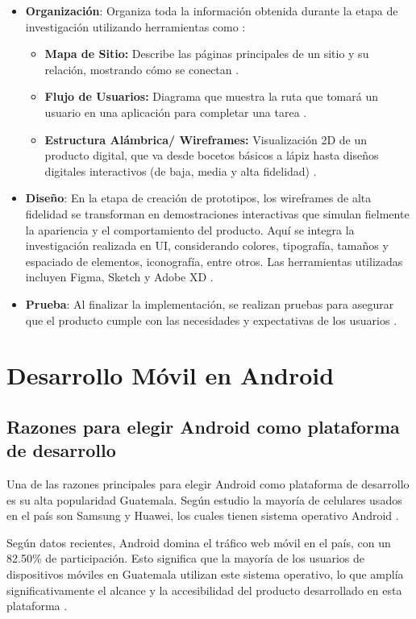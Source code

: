 \begin{itemize}
    
    \item \textbf{Organización}: Organiza toda la información obtenida durante la etapa de investigación utilizando herramientas como \cite{Leon2013}:
    \begin{itemize}
        \item \textbf{Mapa de Sitio:} Describe las páginas principales de un sitio y su relación, mostrando cómo se conectan  \cite{Semi2022}.
        \item \textbf{Flujo de Usuarios:} Diagrama que muestra la ruta que tomará un usuario en una aplicación para completar una tarea  \cite{Semi2022}.
        \item \textbf{Estructura Alámbrica/ Wireframes:} Visualización 2D de un producto digital, que va desde bocetos básicos a lápiz hasta diseños digitales interactivos (de baja, media y alta fidelidad)  \cite{Semi2022}.
    \end{itemize}
    \item \textbf{Diseño}: En la etapa de creación de prototipos, los wireframes de alta fidelidad se transforman en demostraciones interactivas que simulan fielmente la apariencia y el comportamiento del producto. Aquí se integra la investigación realizada en UI, considerando colores, tipografía, tamaños y espaciado de elementos, iconografía, entre otros. Las herramientas utilizadas incluyen Figma, Sketch y Adobe XD  \cite{Semi2022}.
    \item \textbf{Prueba}: Al finalizar la implementación, se realizan pruebas para asegurar que el producto cumple con las necesidades y expectativas de los usuarios  \cite{Semi2022}.
\end{itemize}

\section{Desarrollo Móvil en Android}
\subsection{Razones para elegir Android como plataforma de desarrollo}
Una de las razones principales para elegir Android como plataforma de desarrollo es su alta popularidad Guatemala. Según estudio la mayoría de celulares usados en el país son Samsung y Huawei, los cuales tienen sistema operativo Android \cite{Anonimo2019}.

Según datos recientes, Android domina el tráfico web móvil en el país, con un 82.50\% de participación. Esto significa que la mayoría de los usuarios de dispositivos móviles en Guatemala utilizan este sistema operativo, lo que amplía significativamente el alcance y la accesibilidad del producto desarrollado en esta plataforma \cite{Shum2023}.

